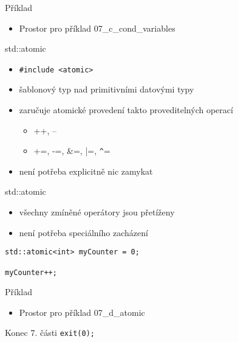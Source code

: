 \documentclass{beamer}
\begin{document}
\begin{xframe}{Příklad}
	\begin{itemize}
		\item Prostor pro příklad 07\_c\_cond\_variables
	\end{itemize}
\end{xframe}

\begin{xframe}{std::atomic}
	\begin{itemize}
		\item \texttt{\#include <atomic>}
		\item šablonový typ nad primitivními datovými typy
		\item zaručuje atomické provedení takto proveditelných operací
			\begin{itemize}
				\item ++, --
				\item +=, -=, \&=, |=, \texttt{\^}=
			\end{itemize}
		\item není potřeba explicitně nic zamykat
	\end{itemize}
\end{xframe}

\begin{xframe}{std::atomic}
	\begin{itemize}
		\item všechny zmíněné operátory jsou přetíženy
		\item není potřeba speciálního zacházení
	\end{itemize}
\begin{lstlisting}[basicstyle=\fontsize{8}{9}\selectfont\ttfamily]
std::atomic<int> myCounter = 0;

myCounter++;
\end{lstlisting}
\end{xframe}

\begin{xframe}{Příklad}
	\begin{itemize}
		\item Prostor pro příklad 07\_d\_atomic
	\end{itemize}
\end{xframe}




\begin{xframe}{Konec 7. části}
\texttt{exit(0);}
\end{xframe}
\end{document}
